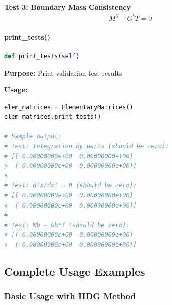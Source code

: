 \textbf{Test 3: Boundary Mass Consistency}
\begin{align}
M^{\partial} - G^b T = 0
\end{align}

\paragraph{print\_tests()}\leavevmode
\begin{lstlisting}[language=Python, caption=Print Tests Method]
def print_tests(self)
\end{lstlisting}

\textbf{Purpose:} Print validation test results

\textbf{Usage:}
\begin{lstlisting}[language=Python, caption=Print Tests Usage]
elem_matrices = ElementaryMatrices()
elem_matrices.print_tests()

# Sample output:
# Test: Integration by parts (should be zero):
# [[ 0.00000000e+00  0.00000000e+00]
#  [ 0.00000000e+00  0.00000000e+00]]
# 
# Test: d²x/dx² = 0 (should be zero):
# [[ 0.00000000e+00  0.00000000e+00]
#  [ 0.00000000e+00  0.00000000e+00]]
#
# Test: Mb - Gb*T (should be zero):
# [[ 0.00000000e+00  0.00000000e+00]
#  [ 0.00000000e+00  0.00000000e+00]]
\end{lstlisting}

\subsection{Complete Usage Examples}
\label{subsec:elementary_matrices_complete_examples}

\subsubsection{Basic Usage with HDG Method}

